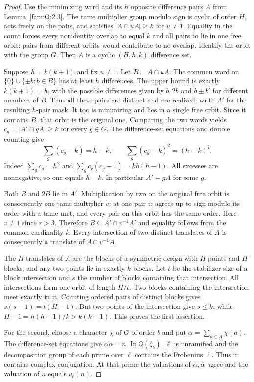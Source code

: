 \documentclass[11pt,a4paper]{article}
\numberwithin{equation}{section}
\theoremstyle{remark}
\begin{document}
\begin{proof}
Use the minimizing word and its $h$ opposite difference pairs $A$
from Lemma~\ref{fam:Q:2.3}. The tame multiplier group modulo sign
is cyclic of order $H$, acts freely on the pairs, and satisfies
$|A\cap uA|\ge k$ for $u\ne1$. Equality in the count forces every
nonidentity overlap to equal $k$ and all pairs to lie in one free orbit:
pairs from different orbits would contribute to no overlap. Identify
the orbit with the group $G$. Then $A$ is a cyclic $(H,h,k)$ difference set.

Suppose $h=k(k+1)$ and fix $u\ne1$. Let $B=A\cap uA$. The common word on $\{0\}\cup\{\pm b:b\in B\}$ has at least $h$ differences. The upper bound is exactly $k(k+1)=h$, with the possible differences given by $b,2b$ and $b\pm b'$ for different members of $B$. Thus all these pairs are distinct and are realized; write $A'$ for the resulting $h$-pair mask. It too is minimizing and lies in a single free orbit. Since it contains $B$, that orbit is the original one. Comparing the two words yields $c_g=|A'\cap gA|\ge k$ for every $g\in G$. The difference-set equations and double counting give
\[
 \sum_g(c_g-k)=h-k,\qquad
 \sum_g(c_g-k)^2=(h-k)^2 .
\]
Indeed $\sum_g c_g=h^2$ and $\sum_g c_g(c_g-1)=kh(h-1)$. All excesses are nonnegative, so one equals $h-k$. In particular $A'=gA$ for some $g$.

Both $B$ and $2B$ lie in $A'$. Multiplication by two on the original free orbit is consequently one tame multiplier $v$: at one pair it agrees up to sign modulo its order with a tame unit, and every pair on this orbit has the same order. Here $v\ne1$ since $r>3$. Therefore $B\subseteq A'\cap v^{-1}A'$ and equality follows from the common cardinality $k$. Every intersection of two distinct translates of $A$ is consequently a translate of $A\cap v^{-1}A$.

The $H$ translates of $A$ are the blocks of a symmetric design with $H$ points and $H$ blocks, and any two points lie in exactly $k$ blocks. Let $t$ be the stabilizer size of a block intersection and $s$ the number of blocks containing that intersection. All intersections form one orbit of length $H/t$. Two blocks containing the intersection meet exactly in it. Counting ordered pairs of distinct blocks gives $s(s-1)=t(H-1)$. But two points of the intersection give $s\le k$, while $H-1=h(h-1)/k>k(k-1)$. This proves the first assertion.

For the second, choose a character $\chi$ of $G$ of order $b$ and put $\alpha=\sum_{a\in A}\chi(a)$. The difference-set equations give $\alpha\overline\alpha=n$. In $\mathbb Q(\zeta_b)$, $\ell$ is unramified and the decomposition group of each prime over $\ell$ contains the Frobenius $\ell$. Thus it contains complex conjugation. At that prime the valuations of $\alpha,\overline\alpha$ agree and the valuation of $n$ equals $v_\ell(n)$.
\end{proof}
\end{document}
